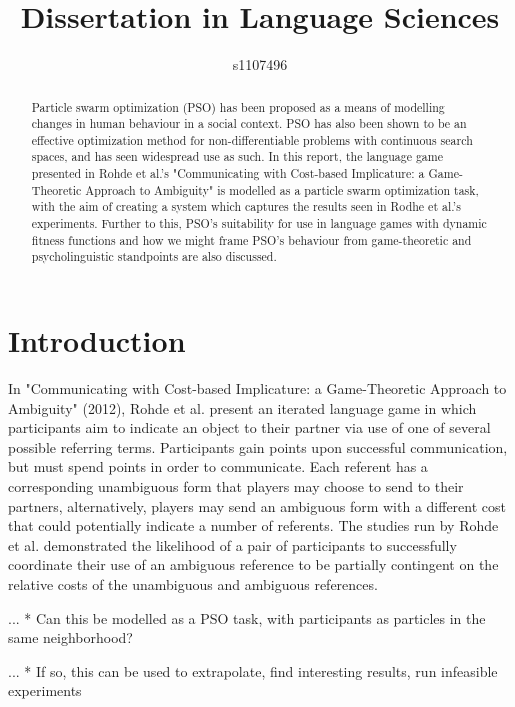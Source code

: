 \documentclass[12pt]{article}
\begin{document}
\title{Dissertation in Language Sciences}
\author{s1107496}

\maketitle

\begin{abstract}
Particle swarm optimization (PSO) has been proposed as a means of modelling changes in human behaviour in a social context. PSO has also been shown to be an effective optimization method for non-differentiable problems with continuous search spaces, and has seen widespread use as such. In this report, the language game presented in Rohde et al.'s "Communicating with Cost-based Implicature: a Game-Theoretic Approach to Ambiguity" is modelled as a particle swarm optimization task, with the aim of creating a system which captures the results seen in Rodhe et al.'s experiments. Further to this, PSO's suitability for use in language games with dynamic fitness functions and how we might frame PSO's behaviour from game-theoretic and psycholinguistic standpoints are also discussed.
\end{abstract}



\section{Introduction}
In "Communicating with Cost-based Implicature: a Game-Theoretic Approach to Ambiguity" (2012), Rohde et al. present an iterated language game in which participants aim to indicate an object to their partner via use of one of several possible referring terms. Participants gain points upon successful communication, but must spend points in order to communicate. Each referent has a corresponding unambiguous form that players may choose to send to
their partners, alternatively, players may send an ambiguous form with a different cost that could potentially indicate a number of referents. The 
studies run by Rohde et al. demonstrated the likelihood of a pair of participants to successfully coordinate their use of an ambiguous reference to be partially contingent on the relative costs of the unambiguous and ambiguous references.

... * Can this be modelled as a PSO task, with participants as particles in the same neighborhood?

... * If so, this can be used to extrapolate, find interesting results, run infeasible experiments
\end{document}
